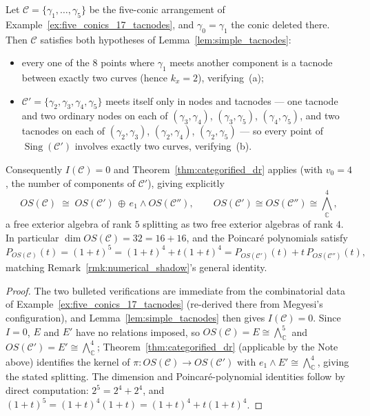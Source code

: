 \documentclass[article,11pt]{amsart} \numberwithin{equation}{section}
\numberwithin{equation}{section}
\begin{document}
{\begin{cor}
	\label{cor:example813-categorified}
	Let $\mathcal C=\{\gamma_1,\dots,\gamma_5\}$ be the five-conic arrangement of
	Example~\ref{ex:five_conics_17_tacnodes}, and $\gamma_0=\gamma_1$ the conic deleted there. Then
	$\mathcal C$ satisfies both hypotheses of Lemma~\ref{lem:simple_tacnodes}:
	\begin{itemize}
		\item every one of the $8$ points where $\gamma_1$ meets another component
		is a tacnode between exactly two curves (hence $k_x=2$), verifying~(a);
		\item $\mathcal C'=\{\gamma_2,\gamma_3,\gamma_4,\gamma_5\}$ meets itself only
		in nodes and tacnodes --- one tacnode and two ordinary nodes on each of
		$(\gamma_3,\gamma_4)$, $(\gamma_3,\gamma_5)$, $(\gamma_4,\gamma_5)$, and two
		tacnodes on each of $(\gamma_2,\gamma_3)$, $(\gamma_2,\gamma_4)$,
		$(\gamma_2,\gamma_5)$ --- so every point of $\operatorname{Sing}(\mathcal C')$ involves
		exactly two curves, verifying~(b).
	\end{itemize}
	Consequently $I(\mathcal C)=0$ and Theorem~\ref{thm:categorified_dr} applies (with $v_0=4$, the
	number of components of $\mathcal C'$), giving explicitly
	\[
	OS(\mathcal C)\;\cong\;OS(\mathcal C')\,\oplus\,e_1\wedge OS(\mathcal C''),
	\qquad OS(\mathcal C')\cong OS(\mathcal C'')\cong{\textstyle\bigwedge}^4_\mathbb C,
	\]
	a free exterior algebra of rank $5$ splitting as two free exterior algebras
	of rank $4$. In particular $\dim OS(\mathcal C)=32=16+16$, and the Poincar\'e
	polynomials satisfy
	\[
	P_{OS(\mathcal C)}(t)=(1+t)^5=(1+t)^4+t(1+t)^4
	=P_{OS(\mathcal C')}(t)+t\,P_{OS(\mathcal C'')}(t),
	\]
	matching Remark~\ref{rmk:numerical_shadow}'s general identity.
\end{cor}

\begin{proof}
	The two bulleted verifications are immediate from the combinatorial data of
	Example~\ref{ex:five_conics_17_tacnodes} (re-derived there from Megyesi's configuration), and
	Lemma~\ref{lem:simple_tacnodes} then gives $I(\mathcal C)=0$. Since $I=0$, $E$ and
	$E'$ have no relations imposed, so $OS(\mathcal C)=E\cong\bigwedge^5_\mathbb C$ and
	$OS(\mathcal C')=E'\cong\bigwedge^4_\mathbb C$; Theorem~\ref{thm:categorified_dr} (applicable by the Note
	above) identifies the kernel of $\pi:OS(\mathcal C)\longrightarrow OS(\mathcal C')$ with
	$e_1\wedge E'\cong\bigwedge^4_\mathbb C$, giving the stated splitting. The dimension
	and Poincar\'e-polynomial identities follow by direct computation:
	$2^5=2^4+2^4$, and $(1+t)^5=(1+t)^4(1+t)=(1+t)^4+t(1+t)^4$.
\end{proof}

}
\end{document}

